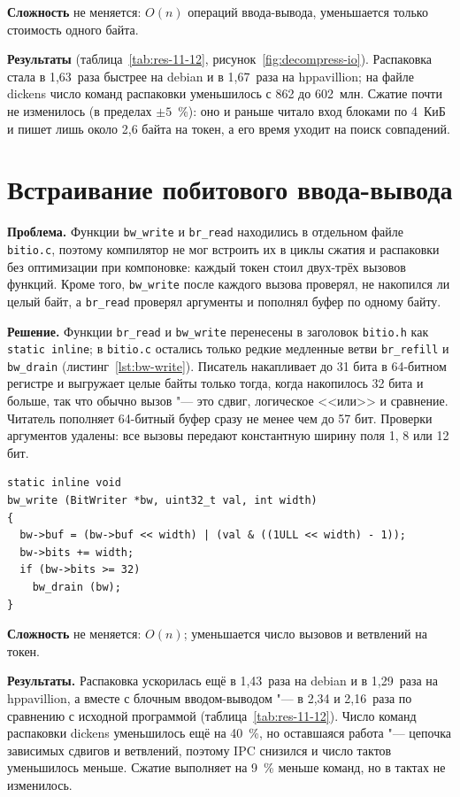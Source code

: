 \textbf{Сложность} не меняется: $O(n)$ операций ввода-вывода, уменьшается
только стоимость одного байта.

\textbf{Результаты} (таблица~\ref{tab:res-11-12}, рисунок~\ref{fig:decompress-io}).
Распаковка стала в 1,63~раза быстрее на debian и в 1,67~раза на
hppavillion; на файле dickens число команд распаковки уменьшилось с 862 до
602~млн. Сжатие почти не изменилось (в пределах $\pm5$~\%): оно и раньше
читало вход блоками по 4~КиБ и пишет лишь около 2,6 байта на токен, а его
время уходит на поиск совпадений.

\section{Встраивание побитового ввода-вывода}
\label{sec:inline-bitio}

\textbf{Проблема.} Функции \texttt{bw\_write} и \texttt{br\_read} находились
в отдельном файле \texttt{bitio.c}, поэтому компилятор не мог встроить их
в циклы сжатия и распаковки без оптимизации при компоновке: каждый токен
стоил двух-трёх вызовов функций. Кроме того, \texttt{bw\_write} после
каждого вызова проверял, не накопился ли целый байт, а \texttt{br\_read}
проверял аргументы и пополнял буфер по одному байту.

\textbf{Решение.} Функции \texttt{br\_read} и \texttt{bw\_write} перенесены
в заголовок \texttt{bitio.h} как \texttt{static inline}; в \texttt{bitio.c}
остались только редкие медленные ветви \texttt{br\_refill} и
\texttt{bw\_drain} (листинг~\ref{lst:bw-write}). Писатель накапливает до 31
бита в 64-битном регистре и выгружает целые байты только тогда, когда
накопилось 32 бита и больше, так что обычно вызов "--- это сдвиг, логическое
<<или>> и сравнение. Читатель пополняет 64-битный буфер сразу не менее чем до
57 бит. Проверки аргументов удалены: все вызовы передают константную ширину
поля 1, 8 или 12 бит.

\begin{lstlisting}[caption={Встраиваемая запись битового поля},label={lst:bw-write}]
static inline void
bw_write (BitWriter *bw, uint32_t val, int width)
{
  bw->buf = (bw->buf << width) | (val & ((1ULL << width) - 1));
  bw->bits += width;
  if (bw->bits >= 32)
    bw_drain (bw);
}
\end{lstlisting}

\textbf{Сложность} не меняется: $O(n)$; уменьшается число вызовов и
ветвлений на токен.

\textbf{Результаты.} Распаковка ускорилась ещё в 1,43~раза на debian и в
1,29~раза на hppavillion, а вместе с блочным вводом-выводом "--- в 2,34 и
2,16~раза по сравнению с исходной программой
(таблица~\ref{tab:res-11-12}). Число команд распаковки dickens уменьшилось
ещё на 40~\%, но оставшаяся работа "--- цепочка зависимых сдвигов и
ветвлений, поэтому IPC снизился и число тактов уменьшилось меньше. Сжатие
выполняет на 9~\% меньше команд, но в тактах не изменилось.

